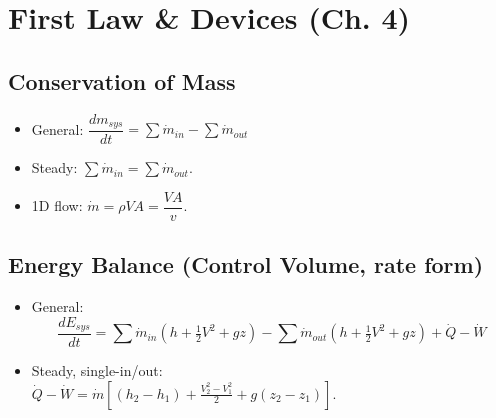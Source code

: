 \documentclass[10pt]{article}
\begin{document}
\section{First Law \& Devices (Ch. 4)}
\begin{multicols}{2}

\subsection{Conservation of Mass}
\begin{itemize}
    \item General: $\dfrac{dm_{sys}}{dt}=\sum \dot m_{in}-\sum \dot m_{out}$
    \item Steady: $\sum \dot m_{in}=\sum \dot m_{out}$.
    \item 1D flow: $\dot m=\rho V A=\dfrac{V A}{v}$.
\end{itemize}

\subsection{Energy Balance (Control Volume, rate form)}
\begin{itemize}
    \item General: \\
    \[
    \frac{dE_{sys}}{dt}=\sum \dot m_{in}\!\left(h+\tfrac12V^2+gz\right)-
    \sum \dot m_{out}\!\left(h+\tfrac12V^2+gz\right)+\dot Q-\dot W
    \]
    \item Steady, single-in/out: \\
    $
    \dot Q-\dot W=\dot m\!\left[(h_2-h_1)+\tfrac{V_2^2-V_1^2}{2}+g(z_2-z_1)\right].
    $
\end{itemize}


\end{multicols}
\end{document}

